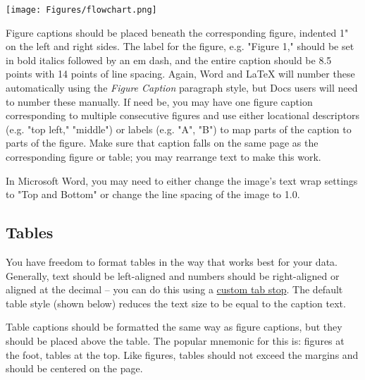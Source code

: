\documentclass[
	letterpaper, %
]{jdf}
\begin{document}
\begin{Abstract}
\begin{jdffigure}
\texttt{[image: Figures/flowchart.png]}%
\label{fig:flowchart}%
\end{jdffigure}

Figure captions should be placed beneath the corresponding figure, indented 1" on the left and right sides. The label for the figure, e.g. "Figure 1," should be set in bold italics followed by an em dash, and the entire caption should be 8.5 points with 14 points of line spacing. Again, Word and LaTeX will number these automatically using the \emph{Figure Caption} paragraph style, but Docs users will need to number these manually. If need be, you may have one figure caption corresponding to multiple consecutive figures and use either locational descriptors (e.g. "top left," "middle") or labels (e.g. "A", "B") to map parts of the caption to parts of the figure. Make sure that caption falls on the same page as the corresponding figure or table; you may rearrange text to make this work.

In Microsoft Word, you may need to either change the image’s text wrap settings to "Top and Bottom" or change the line spacing of the image to 1.0.

\subsection{Tables}
You have freedom to format tables in the way that works best for your data. Generally, text should be left-aligned and numbers should be right-aligned or aligned at the decimal – you can do this using a \href{https://practicaltypography.com/tabs-and-tab-stops.html}{custom tab stop}. The default table style (shown below) reduces the text size to be equal to the caption text.

Table captions should be formatted the same way as figure captions, but they should be placed above the table. The popular mnemonic for this is: figures at the foot, tables at the top. Like figures, tables should not exceed the margins and should be centered on the page.


\end{Abstract}
\end{document}

